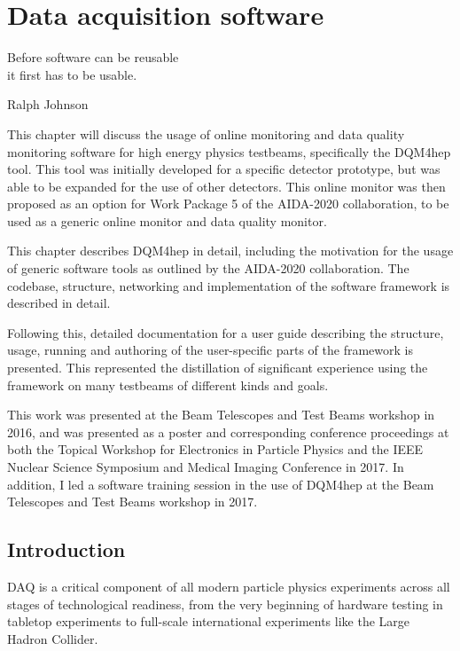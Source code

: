 \chapter{Data acquisition software}
\label{chapter:dqm4hep}

\epigraph{Before software can be reusable \\it first has to be usable.}{Ralph Johnson}

This chapter will discuss the usage of online monitoring and data quality monitoring software for high energy physics testbeams, specifically the \acrshort{DQM4hep} tool. This tool was initially developed for a specific detector prototype, but was able to be expanded for the use of other detectors. This online monitor was then proposed as an option for Work Package 5 of the \acrshort{AIDA}-2020 collaboration, to be used as a generic online monitor and data quality monitor.

This chapter describes \acrshort{DQM4hep} in detail, including the motivation for the usage of generic software tools as outlined by the \acrshort{AIDA}-2020 collaboration. The codebase, structure, networking and implementation of the software framework is described in detail.

Following this, detailed documentation for a user guide describing the structure, usage, running and authoring of the user-specific parts of the framework is presented. This represented the distillation of significant experience using the framework on many testbeams of different kinds and goals.

This work was presented at the Beam Telescopes and Test Beams workshop in 2016, and was presented as a poster and corresponding conference proceedings at both the Topical Workshop for Electronics in Particle Physics\cite{dqm4hep-twepp} and the \acrshort{IEEE} Nuclear Science Symposium and Medical Imaging Conference\cite{dqm4hep-ieee} in 2017. In addition, I led a software training session in the use of \acrshort{DQM4hep} at the Beam Telescopes and Test Beams workshop in 2017. %

\section{Introduction}
\acrfull{DAQ} is a critical component of all modern particle physics experiments across all stages of technological readiness, from the very beginning of hardware testing in tabletop experiments to full-scale international experiments like the Large Hadron Collider.

